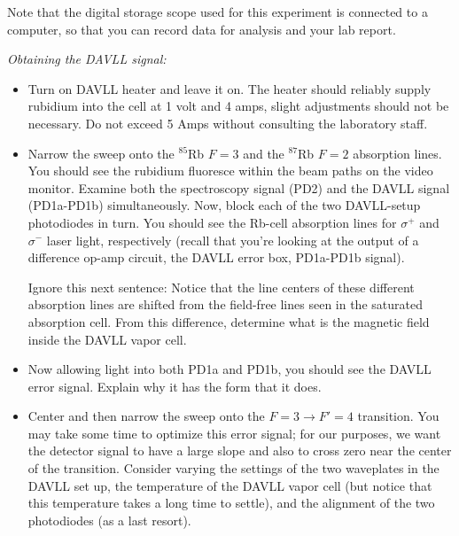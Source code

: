 \documentclass{../lab}
\begin{document}

Note that the digital storage scope used for this experiment is connected to a computer, so that you can record data for analysis and your lab report.

\emph{Obtaining the DAVLL signal:}

\begin{itemize}
    \item Turn on DAVLL heater and leave it on. The heater should reliably supply rubidium into the cell at 1 volt and 4 amps, slight adjustments should not be necessary. Do not exceed 5 Amps without consulting the laboratory staff.

    \item Narrow the sweep onto the $^{85}$Rb $F=3 $ and the $^{87}$Rb $F=2 $ absorption lines. You should see the rubidium fluoresce within the beam paths on the video monitor. Examine both the spectroscopy signal (PD2) and the DAVLL signal (PD1a-PD1b) simultaneously. Now, block each of the two DAVLL-setup photodiodes in turn. You should see the Rb-cell absorption lines for $\sigma^+ $ and $\sigma^-$ laser light, respectively (recall that you're looking at the output of a difference op-amp circuit, the DAVLL error box, PD1a-PD1b signal). 
    
    Ignore this next sentence: Notice that the line centers of these different absorption lines are shifted from the field-free lines seen in the saturated absorption cell. From this difference, determine what is the magnetic field inside the DAVLL vapor cell.

    \item Now allowing light into both PD1a and PD1b, you should see the DAVLL error signal. Explain why it has the form that it does.

    \item Center and then narrow the sweep onto the $F = 3 \rightarrow F' = 4 $ transition. You may take some time to optimize this error signal; for our purposes, we want the detector signal to have a large slope and also to cross zero near the center of the transition. Consider varying the settings of the two waveplates in the DAVLL set up, the temperature of the DAVLL vapor cell (but notice that this temperature takes a long time to settle), and the alignment of the two photodiodes (as a last resort).
\end{itemize}
\end{document}
